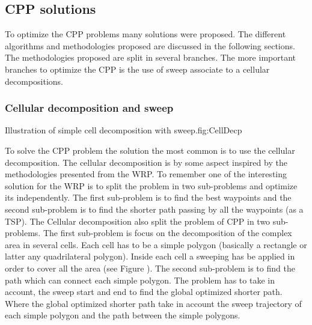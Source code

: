 \subsection{CPP solutions}



To optimize the CPP problems many solutions were proposed. The different algorithms and methodologies proposed are discussed in the following sections. The methodologies proposed are  split in several branches. 
The more important branches to optimize the CPP is the use of sweep associate to a cellular decompositions.
%
%

\subsubsection{Cellular decomposition and sweep} \label{sec:CPPcellDecompSol}
\begin{mfigures}[!]{Illustration  of  simple cell decomposition with sweep.}{fig:CellDecp} \centering
{}

\end{mfigures}	
To solve the CPP problem the solution the most common is to use the cellular decomposition. The cellular decomposition is by some aspect inspired by the methodologies presented from the WRP.
To remember one of the interesting solution for the WRP  is to split the problem in two sub-problems and optimize its independently. The first sub-problem is to find the best waypoints and the second sub-problem is to find the shorter path passing by all the waypoints (as a TSP).
 The Cellular decomposition also split the problem of CPP in two sub-problems. The first sub-problem is focus on the decomposition of the complex area in several cells. Each cell has to be a simple polygon (basically a rectangle or latter any quadrilateral polygon). Inside each cell a sweeping has be applied in order to cover all the area (see Figure ). The second sub-problem is to find the path which can connect each simple polygon. The problem has to take in account, the sweep start and end to find the global optimized shorter path. Where the global optimized shorter path take in account the sweep trajectory of each simple polygon and the path between the simple polygons.
 
